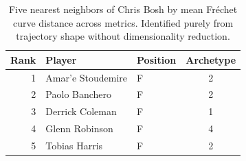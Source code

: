 \begin{table}[htbp]
  \centering\small
  \begin{tabular}{rllc}
    \toprule
    Rank & Player & Position & Archetype \\
    \midrule
    1 & Amar'e Stoudemire & F & 2 \\
    2 & Paolo Banchero & F & 2 \\
    3 & Derrick Coleman & F & 1 \\
    4 & Glenn Robinson & F & 4 \\
    5 & Tobias Harris & F & 2 \\
    \bottomrule
  \end{tabular}
  \caption{Five nearest neighbors of Chris Bosh by mean Fr\'{e}chet curve distance across metrics. Identified purely from trajectory shape without dimensionality reduction.}
  \label{tab:Chris_Bosh_frechet_curve_neighbors}
\end{table}

